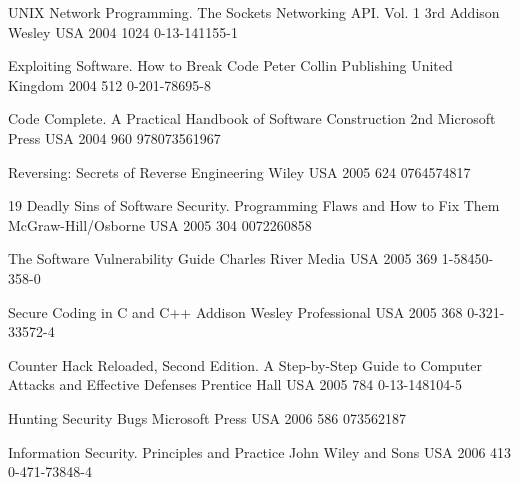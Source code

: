 \begin{thebibliography}{9}
		{
			\biband
			\biband
			}
		{{UNIX} Network Programming. The Sockets Networking {API}. Vol. 1}
		{3rd}
		{Addison Wesley}
		{USA}
		{2004}
		{1024}
		{0-13-141155-1}
	
		{
			\biband
			}
		{Exploiting Software. How to Break Code}
		{}
		{Peter Collin Publishing}
		{United Kingdom}
		{2004}
		{512}
		{0-201-78695-8}
	
		{}
		{Code Complete. A Practical Handbook of Software Construction}
		{2nd}
		{Microsoft Press}
		{USA}
		{2004}
		{960}
		{978073561967}
	
		{}
		{Reversing: Secrets of Reverse Engineering}
		{}
		{Wiley}
		{USA}
		{2005}
		{624}
		{0764574817}
	
		{
			\biband
			\biband
			}
		{19 Deadly Sins of Software Security. Programming Flaws and How to Fix Them}
		{}
		{McGraw-Hill/Osborne}
		{USA}
		{2005}
		{304}
		{0072260858}
	
		{
			\biband
			}
		{The Software Vulnerability Guide}
		{}
		{Charles River Media}
		{USA}
		{2005}
		{369}
		{1-58450-358-0}
	
		{}
		{Secure Coding in {C} and {C++}}
		{}
		{Addison Wesley Professional}
		{USA}
		{2005}
		{368}
		{0-321-33572-4}
	
		{
			\biband
			}
		{Counter Hack Reloaded, Second Edition. A Step-by-Step Guide to Computer Attacks and Effective Defenses}
		{}
		{Prentice Hall}
		{USA}
		{2005}
		{784}
		{0-13-148104-5}
	
		{
			\biband
			\biband
			}
		{Hunting Security Bugs}
		{}
		{Microsoft Press}
		{USA}
		{2006}
		{586}
		{073562187}
	
		{}
		{Information Security. Principles and Practice}
		{}
		{John Wiley and Sons}
		{USA}
		{2006}
		{413}
		{0-471-73848-4}
	

\end{thebibliography}

